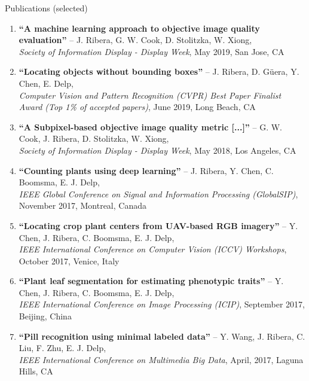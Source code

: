 \documentclass{resume} %
\begin{document}

\begin{rSection}{Publications (selected)}

\footnotesize
\begin{enumerate}
\setlength{\itemindent}{-.1in}
\item 
\textbf{``A machine learning approach to objective image quality evaluation''} -- J. Ribera, G. W. Cook, D. Stolitzka, W. Xiong, \\
        \emph{Society of Information Display - Display Week}, May 2019, San Jose, CA
\item 
\textbf{``Locating objects without bounding boxes''} -- J. Ribera, D. Güera, Y. Chen, E. Delp, \\
\emph{Computer Vision and Pattern Recognition (CVPR) Best Paper Finalist Award (Top 1\% of accepted papers)}, June 2019, Long Beach, CA
\item 
    \textbf{``A Subpixel-based objective image quality metric [...]''} -- G. W. Cook, J. Ribera, D. Stolitzka, W. Xiong, \\
    \emph{Society of Information Display - Display Week}, May 2018, Los Angeles, CA
\item 
\textbf{``Counting plants using deep learning''} -- J. Ribera, Y. Chen, C. Boomsma, E. J. Delp, \\
		\emph{IEEE Global Conference on Signal and Information Processing (GlobalSIP)}, November 2017, Montreal, Canada
\item 
\textbf{``Locating crop plant centers from UAV-based RGB imagery''} -- Y. Chen, J. Ribera, C. Boomsma, E. J. Delp, \\
\emph{IEEE International Conference on Computer Vision (ICCV) Workshops}, October 2017, Venice, Italy
\item 
\textbf{``Plant leaf segmentation for estimating phenotypic traits''} -- Y. Chen, J. Ribera, C. Boomsma, E. J. Delp, \\
\emph{IEEE International Conference on Image Processing (ICIP)}, September 2017, Beijing, China
\item 
\textbf{``Pill recognition using minimal labeled data''} -- Y. Wang, J. Ribera, C. Liu, F. Zhu, E. J. Delp, \\
		\emph{IEEE International Conference on Multimedia Big Data}, April, 2017, Laguna Hills, CA %

\end{enumerate}
\end{rSection}
\end{document}

